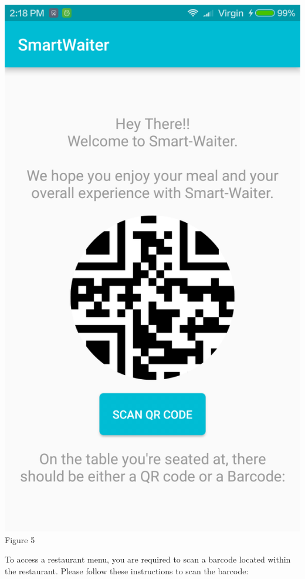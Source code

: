 \documentclass[12pt, titlepage]{article}
\begin{document}
\begin{center}\includegraphics[scale=0.15]{qrcode.png}	\linebreak Figure 5
\end{center}

\noindent To access a restaurant menu, you are required to scan a barcode located within the restaurant. Please follow these instructions to scan the barcode:
\end{document}
